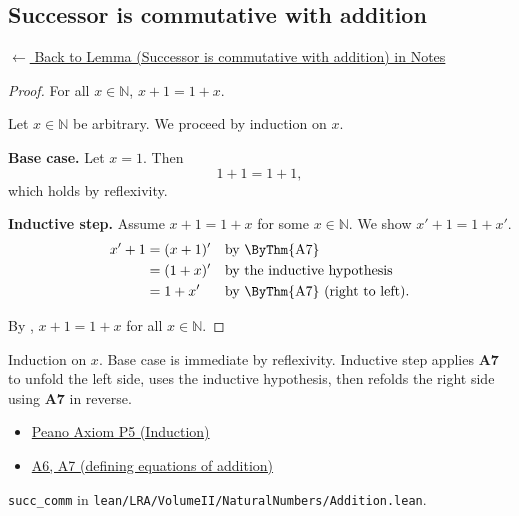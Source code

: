 
\subsection*{Successor is commutative with addition}
\label{prf:landau-succ-comm}

\begin{remark*}[Return]
\hyperref[lem:landau-succ-comm]{$\leftarrow$ Back to Lemma
(Successor is commutative with addition) in Notes}
\end{remark*}

\begin{proof}
\Claim For all $x \in \mathbb{N}$, $x + 1 = 1 + x$.

Let $x \in \mathbb{N}$ be arbitrary. We proceed by induction on $x$.

\textbf{Base case.} Let $x = 1$. Then
\[
  1 + 1 = 1 + 1,
\]
which holds by reflexivity.

\textbf{Inductive step.} Assume $x + 1 = 1 + x$ for some $x \in \mathbb{N}$.
We show $x' + 1 = 1 + x'$.
\[
\begin{aligned}
  x' + 1
    &= (x + 1)'  && \text{by \ByThm{A7}} \\
    &= (1 + x)'  && \text{by the inductive hypothesis} \\
    &= 1 + x'    && \text{by \ByThm{A7} (right to left).}
\end{aligned}
\]

By , $x + 1 = 1 + x$ for all $x \in \mathbb{N}$.
\end{proof}

\begin{remark*}
Induction on $x$. Base case is immediate by reflexivity. Inductive step
applies \textbf{A7} to unfold the left side, uses the inductive hypothesis,
then refolds the right side using \textbf{A7} in reverse.

\end{remark*}

\begin{remark*}[Dependencies]
\begin{itemize}
  \item \hyperref[ax:landau-peano]{Peano Axiom P5 (Induction)}
  \item \hyperref[thm:landau-addition-exists-unique]{A6, A7 (defining equations of addition)}
\end{itemize}

\end{remark*}

\begin{remark*}
\texttt{succ\_comm} in
\texttt{lean/LRA/VolumeII/NaturalNumbers/Addition.lean}.
\end{remark*}